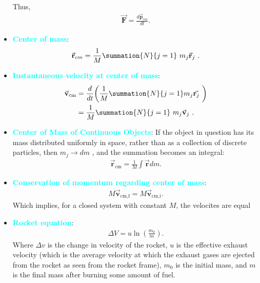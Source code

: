 \documentclass{report}
\begin{document}
\begin{itemize}
            \bigbreak \noindent 
            Thus, 
            \begin{align*}
                \vec{\mathbf{F}} = \frac{d \vec{\mathbf{p}}_{cm}}{dt}
            .\end{align*}
            \bigbreak \noindent 
        \item \textbf{\textcolor{cyan}{Center of mass}}:
            \begin{align*}
                \vec{\mathbf{r}}_{cm} = \frac{1}{M}\summation{N}{j=1}\ m_{j}\vec{\mathbf{r}}_{j} \
            .\end{align*}
        \item \textbf{\textcolor{cyan}{Instantaneous velocity at center of mass}}:
            \begin{align*}
                \vec{\mathbf{v}}_{\text{cm}} &= \frac{d}{dt}\bigg(\frac{1}{M}\summation{N}{j=1}m_{j}\vec{\mathbf{r}_{j}}\ \bigg) \\
                    &=\frac{1}{M}\summation{N}{j=1}\ m_{j}\vec{\mathbf{v}}_{j}\
            .\end{align*}
        \item \textbf{\textcolor{cyan}{Center of Mass of Continuous Objects}}:
            If the object in question has its mass distributed uniformly in space, rather than as a collection of discrete particles, then  $m_{j} \rightarrow dm $ , and the summation becomes an integral:
            \begin{align*}
                \vec{\mathbf{r}}_{\text{cm}} = \frac{1}{M}\int \vec{\mathbf{r}}dm
            .\end{align*}
        \item \textbf{\textcolor{cyan}{Conservation of momentum regarding center of mass}}:
            \begin{align*}
                M\vec{\mathbf{v}}_{\text{cm,f}} = M\vec{\mathbf{v}}_{\text{cm,i}}
            .\end{align*}
            Which implies, for a closed system with constant $M$, the velocites are equal 
        \item \textbf{\textcolor{cyan}{Rocket equation}}:
            \begin{align*}
                \Delta V = u\ln{\left(\frac{m_{0}}{m}\right)}
            .\end{align*}
            Where $\Delta v$ is the change in velocity of the rocket, $u$ is the effective exhaust velocity (which is the average velocity at which the exhaust gases are ejected from the rocket as seen from the rocket frame), $m_{0}$ is the initial mass, and $m$ is the final mass after burning some amount of fuel.

\end{itemize}
\end{document}
